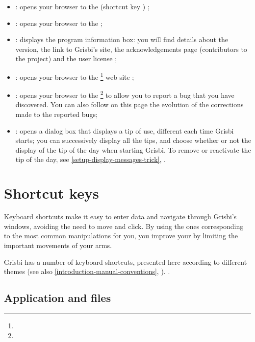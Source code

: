 \begin{itemize}
	\item {} : opens your browser to the   (shortcut key  ) ;
	\item {} : opens your browser to the   ;
	\item {} : displays the program information box: you will find details about the version, the link to Grisbi's site, the acknowledgements page (contributors to the project) and the user license ;
	\item {} : opens your browser to the \footnote{\urlGrisbi{}} web site ;
	\item {} : opens your browser to the \footnote{\urlBugTracker{}} to allow you to report a bug that you have discovered. You can also follow on this page the evolution of the corrections made to the reported bugs;
	\item {} : opens a dialog box that displays a tip of use, different each time Grisbi starts; you can successively display all the tips, and choose whether or not the display of the tip of the day when starting Grisbi. To remove or reactivate the tip of the day, see \vref{setup-display-messages-trick}, .
\end{itemize}


\section{Shortcut keys\label{home-shortcuts}}


Keyboard shortcuts make it easy to enter data and navigate through Grisbi's windows, avoiding the need to move and click. By using the ones corresponding to the most common manipulations for you, you improve your  by limiting the important movements of your arms.
 
Grisbi has a number of keyboard shortcuts, presented here according to different themes (see also  \vref{introduction-manual-conventions}, ).
.

\subsection{Application and files}

